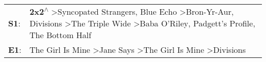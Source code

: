 \begin{supertabular}{p{0.03\textwidth}p{0.92\textwidth}}
 \textbf{S1}:  &  \textbf{2x2\textsuperscript{$\wedge$}} \textgreater \enspace Syncopated Strangers\textsuperscript{}, \enspace Blue Echo\textsuperscript{} \textgreater \enspace Bron-Yr-Aur\textsuperscript{}, \enspace Divisions\textsuperscript{} \textgreater \enspace The Triple Wide\textsuperscript{} \textgreater \enspace Baba O'Riley\textsuperscript{}, \enspace Padgett's Profile\textsuperscript{}, \enspace The Bottom Half\textsuperscript{}  \enspace  \\
 \textbf{E1}:  &                                                                                                                                                                                                                                             The Girl Is Mine\textsuperscript{} \textgreater \enspace Jane Says\textsuperscript{} \textgreater \enspace The Girl Is Mine\textsuperscript{} \textgreater \enspace Divisions\textsuperscript{}  \enspace  \\
\end{supertabular}
